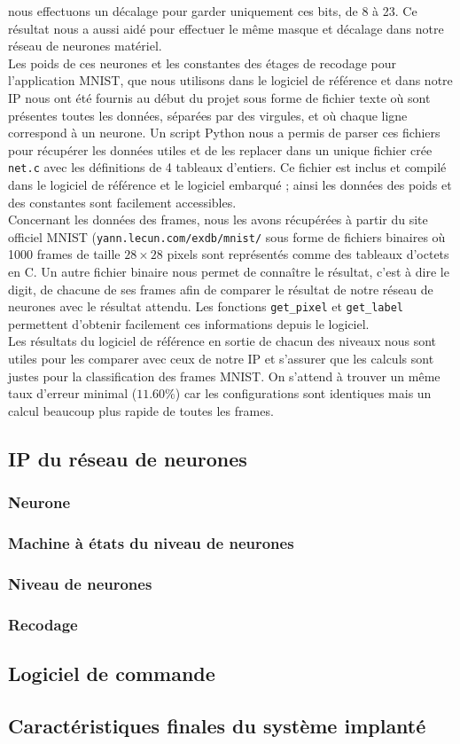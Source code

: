 nous effectuons un décalage pour garder uniquement ces bits, de 8 à 23. Ce
résultat nous a aussi aidé pour effectuer le même masque et décalage dans notre
réseau de neurones matériel. \\
Les poids de ces neurones et les constantes des étages de recodage
pour l'application MNIST, que nous utilisons dans
le logiciel de référence et dans notre IP nous ont été fournis au début du projet
sous forme de fichier texte où sont présentes toutes les données, séparées par
des virgules, et où chaque ligne correspond à un neurone. Un script Python nous
a permis de parser ces fichiers pour récupérer les données utiles et de les
replacer dans un unique fichier crée \texttt{net.c} avec les définitions de
4 tableaux d'entiers. Ce fichier est inclus et compilé dans le logiciel de référence et
le logiciel embarqué ; ainsi les données des poids et des constantes sont
facilement accessibles. \\
Concernant les données des frames, nous les avons récupérées à partir du site
officiel MNIST (\texttt{yann.lecun.com/exdb/mnist/} sous forme de fichiers
binaires où 1000 frames de taille $28 \times 28$ pixels sont représentés comme
des tableaux d'octets en C. Un autre fichier binaire nous permet de connaître
le résultat, c'est à dire le digit, de chacune de ses frames afin de comparer le
résultat de notre réseau de neurones avec le résultat attendu.
Les fonctions \texttt{get\_pixel} et \texttt{get\_label} permettent d'obtenir
facilement ces informations depuis le logiciel. \\
Les résultats du logiciel de référence en sortie de chacun des niveaux nous
sont utiles pour les comparer avec ceux de notre IP et s'assurer que les calculs
sont justes pour la classification des frames MNIST. On s'attend à trouver
un même taux d'erreur minimal ($11.60\%$) car les configurations sont identiques
mais un calcul beaucoup plus rapide de toutes les frames.

\subsection{IP du réseau de neurones}
\subsubsection{Neurone}
\subsubsection{Machine à états du niveau de neurones}
\subsubsection{Niveau de neurones}
\subsubsection{Recodage}

\subsection{Logiciel de commande}

\subsection{Caractéristiques finales du système implanté}
